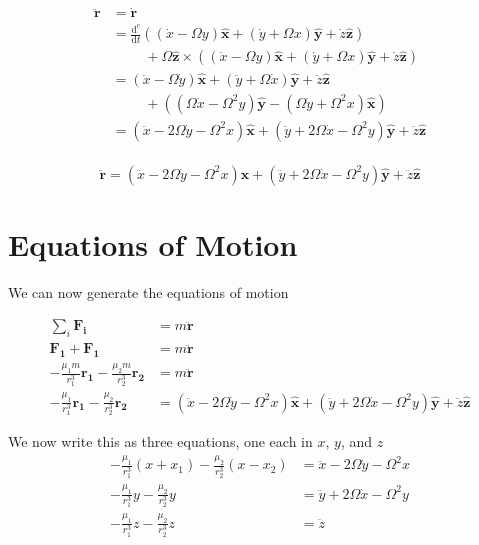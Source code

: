 \documentclass{article}
\newcommand{\dd}[2]{\frac{\mathrm{d}#1}{\mathrm{d}#2}}
\newcommand{\vv}[1]{\boldsymbol{#1}}
\newcommand{\vh}[1]{\boldsymbol{\hat{#1}}}
\begin{document}
\[
\begin{aligned}
    \vv{\ddot{r}}&=\dot{\vv{r}}\\
    &=\dd{^c}{t}\left(\left(\dot{x}-\Omega y\right)\vh{x}+\left(\dot{y}+\Omega x\right)\vh{y}+\dot{z}\vh{z}\right)\\
        &\phantom{=}\quad+\Omega \vh{z}\times\left(\left(\dot{x}-\Omega y\right)\vh{x}+\left(\dot{y}+\Omega x\right)\vh{y}+\dot{z}\vh{z}\right)\\
    &=\left(\ddot{x}-\Omega \dot{y}\right)\vh{x}+\left(\ddot{y}+\Omega \dot{x}\right)\vh{y}+\ddot{z}\vh{z}\\
        &\phantom{=}\quad+\left(\left(\Omega\dot{x}-\Omega^2 y\right)\vh{y}-\left(\Omega\dot{y}+\Omega^2 x\right)\vh{x}\right)\\
    &=\left(\ddot{x}-2\Omega\dot{y}-\Omega^2 x\right)\vh{x} + \left(\ddot{y}+2\Omega\dot{x}-\Omega^2 y\right)\vh{y}+\ddot{z}\vh{z}\\
\end{aligned}
\]

\[\boxed{\vv{\ddot{r}}=\left(\ddot{x}-2\Omega\dot{y}-\Omega^2 x\right)\vh{x} + \left(\ddot{y}+2\Omega\dot{x}-\Omega^2 y\right)\vh{y}+\ddot{z}\vh{z}}\]

\section*{Equations of Motion}
We can now generate the equations of motion

\[\begin{aligned}
\sum_i \vv{F_i}&=m\vv{\ddot{r}}\\
\vv{F_1}+\vv{F_1}&=m\vv{\ddot{r}}\\
-\frac{\mu_1m}{r_1^3}\vv{r_1}-\frac{\mu_2m}{r_2^3}\vv{r_2}&=m\vv{\ddot{r}}\\
-\frac{\mu_1}{r_1^3}\vv{r_1}-\frac{\mu_2}{r_2^3}\vv{r_2}&=\left(\ddot{x}-2\Omega\dot{y}-\Omega^2 x\right)\vh{x} + \left(\ddot{y}+2\Omega\dot{x}-\Omega^2 y\right)\vh{y}+\ddot{z}\vh{z}
\end{aligned}\]

We now write this as three equations, one each in $x$, $y$, and $z$
\[\begin{aligned}
    -\frac{\mu_1}{r_1^3}(x+x_1)-\frac{\mu_2}{r_2^3}(x-x_2)&=\ddot{x}-2\Omega\dot{y}-\Omega^2 x\\
    -\frac{\mu_1}{r_1^3}y-\frac{\mu_2}{r_2^3}y&=\ddot{y}+2\Omega\dot{x}-\Omega^2 y\\
    -\frac{\mu_1}{r_1^3}z-\frac{\mu_2}{r_2^3}z&=\ddot{z}
\end{aligned}\]
\end{document}
